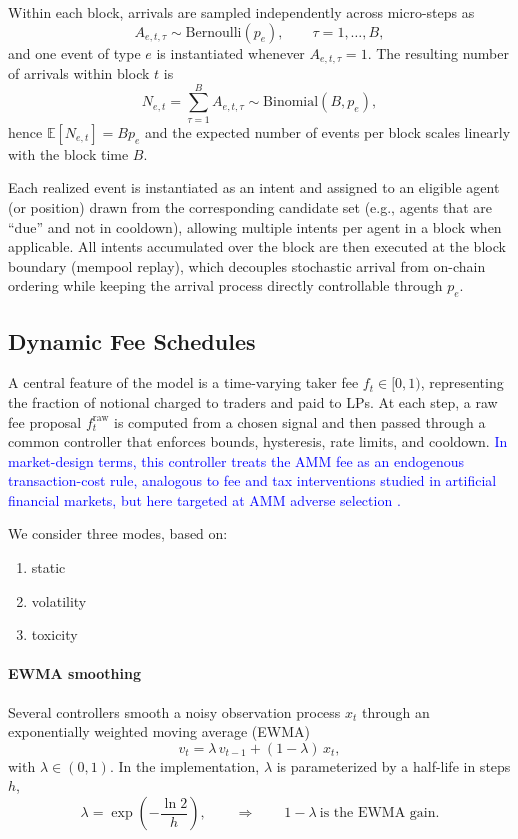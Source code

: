 \documentclass[11pt]{article}
\begin{document}
Within each block, arrivals are sampled independently across micro-steps as
\[
A_{e,t,\tau}\sim \text{Bernoulli}(p_e),\qquad \tau=1,\dots,B,
\]
and one event of type $e$ is instantiated whenever $A_{e,t,\tau}=1$. The resulting number of arrivals within block $t$ is
\[
N_{e,t}=\sum_{\tau=1}^B A_{e,t,\tau}\sim \text{Binomial}(B,p_e),
\]
hence $\mathbb{E}[N_{e,t}]=Bp_e$ and the expected number of events per block scales linearly with the block time $B$.

Each realized event is instantiated as an intent and assigned to an eligible agent (or position) drawn from the corresponding candidate set (e.g., agents that are “due” and not in cooldown), allowing multiple intents per agent in a block when applicable. All intents accumulated over the block are then executed at the block boundary (mempool replay), which decouples stochastic arrival from on-chain ordering while keeping the arrival process directly controllable through $p_e$.



\subsection{Dynamic Fee Schedules}
\label{subsec:fees}

A central feature of the model is a time-varying taker fee $f_t \in [0,1)$, representing the fraction of notional charged to traders and paid to LPs.
At each step, a raw fee proposal $f^{\mathrm{raw}}_t$ is computed from a chosen signal and then passed through a common controller that enforces bounds, hysteresis, rate limits, and cooldown. \textcolor{blue}{In market-design terms, this controller treats the AMM fee as an endogenous transaction-cost rule, analogous to fee and tax interventions studied in artificial financial markets, but here targeted at AMM adverse selection \cite{westerhoff2006,mannaro2008,pellizzari2009,cartea2023}.}

We consider three modes, based on:
\begin{enumerate}[label=\roman*), leftmargin=*]
  \item static
  \item volatility
  \item toxicity
\end{enumerate}

\paragraph{EWMA smoothing}
Several controllers smooth a noisy observation process $x_t$ through an exponentially weighted moving average (EWMA)
\begin{equation}
  v_t = \lambda\, v_{t-1} + (1-\lambda)\, x_t,
  \label{eq:ewma}
\end{equation}
with $\lambda\in(0,1)$. In the implementation, $\lambda$ is parameterized by a half-life in steps $h$,
\begin{equation}
  \lambda = \exp\!\left(-\frac{\ln 2}{h}\right),
  \qquad\Rightarrow\qquad
  1-\lambda \ \text{is the EWMA gain.}
  \label{eq:ewma-halflife}
\end{equation}
\end{document}
